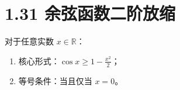 \documentclass{article}
\begin{document}
\section*{1.31 余弦函数二阶放缩}
对于任意实数 \( x \in \mathbb{R} \)：
\begin{enumerate}
    \item 核心形式：\( \cos x \geq 1 - \frac{x^2}{2} \)；
    \item 等号条件：当且仅当 \( x=0 \)。
\end{enumerate}
\end{document}
